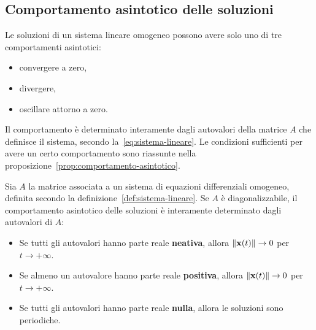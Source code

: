 \subsection{Comportamento asintotico delle soluzioni}
\label{subsec:comportamento-asintotico}
Le soluzioni di un sistema lineare omogeneo possono avere solo uno di tre comportamenti asintotici:
\begin{itemize}
    \item convergere a zero,
    \item divergere,
    \item oscillare attorno a zero.
\end{itemize}
Il comportamento è determinato interamente dagli autovalori della matrice $A$ che definisce il
sistema, secondo la~\eqref{eq:sistema-lineare}.
Le condizioni sufficienti per avere un certo comportamento sono riassunte nella proposizione~\ref{prop:comportamento-asintotico}.
\begin{prop}
    Sia $A$ la matrice associata a un sistema di equazioni differenziali omogeneo,
    definita secondo la definizione~\ref{def:sistema-lineare}.
    Se $A$ è diagonalizzabile, il comportamento asintotico delle soluzioni è interamente
    determinato dagli autovalori di $A$:
    \begin{itemize}
        \item Se tutti gli autovalori hanno parte reale \textbf{neativa}, allora $\lVert\mathbf{x}(t)\rVert \to 0$ per $t \to +\infty$.%
        \item Se almeno un autovalore hanno parte reale \textbf{positiva}, allora $\lVert\mathbf{x}(t)\rVert \to 0$ per $t \to +\infty$.%
        \item Se tutti gli autovalori hanno parte reale \textbf{nulla}, allora le soluzioni sono periodiche.
    \end{itemize}
    \label{prop:comportamento-asintotico}
\end{prop}

